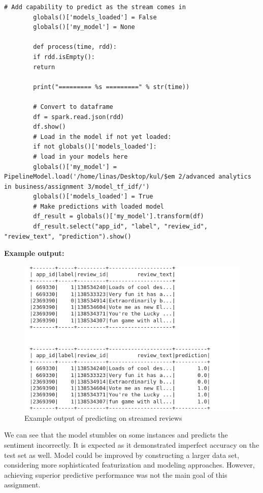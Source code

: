 \documentclass[11pt, oneside]{article}   	%
\begin{document}
		\begin{lstlisting}[style=mystyle]
		# Add capability to predict as the stream comes in
		globals()['models_loaded'] = False
		globals()['my_model'] = None
		
		def process(time, rdd):
		if rdd.isEmpty():
		return
		
		print("========= %s =========" % str(time))
		
		# Convert to dataframe
		df = spark.read.json(rdd)
		df.show()
		# Load in the model if not yet loaded:
		if not globals()['models_loaded']:
		# load in your models here
		globals()['my_model'] = PipelineModel.load('/home/linas/Desktop/kul/$em 2/advanced analytics in business/assignment 3/model_tf_idf/')
		globals()['models_loaded'] = True
		# Make predictions with loaded model
		df_result = globals()['my_model'].transform(df)
		df_result.select("app_id", "label", "review_id", "review_text", "prediction").show()
		\end{lstlisting}
		
		\textbf{Example output:}
		
	\begin{figure}[h]
		\hspace{1cm} %
		\includegraphics[width=1\linewidth]{output.png}
		\caption{Example output of predicting on streamed reviews}
		\label{figure label}
	\end{figure}
	
	We can see that the model stumbles on some instances and predicts the sentiment incorrectly. It is expected as it demonstrated imperfect accuracy on the test set as well. Model could be improved by constructing a larger data set, considering more sophisticated featurization and modeling approaches. However, achieving superior predictive performance was not the main goal of this assignment.	
	
\end{document}
